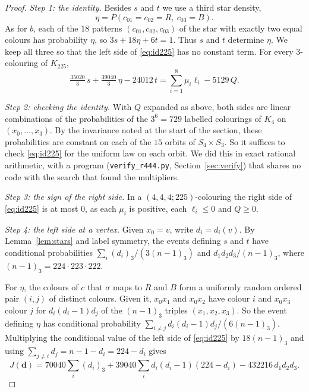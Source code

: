 \documentclass[11pt]{article}
\theoremstyle{spacedplain}
\theoremstyle{spaceddef}
\theoremstyle{spacedremark}
\begin{document}
\begin{proof}
\emph{Step 1: the identity.}
Besides $s$ and $t$ we use a third star density,
\[
\eta=P(c_{01}{=}c_{02}{=}R,\ c_{03}{=}B).
\]
As for $b$, each of the $18$ patterns $(c_{01},c_{02},c_{03})$ of the star with exactly two equal colours has probability $\eta$, so $3s+18\eta+6t=1$.
Thus $s$ and $t$ determine $\eta$.
We keep all three so that the left side of \eqref{eq:id225} has no constant term.
For every $3$-colouring of $K_{225}$,
\begin{equation}\label{eq:id225}
\tfrac{35020}{3}\,s+\tfrac{39040}{3}\,\eta-24012\,t=\sum_{i=1}^8\mu_i\ell_i-5129\,Q .
\end{equation}

\emph{Step 2: checking the identity.}
With $Q$ expanded as above, both sides are linear combinations of the probabilities of the $3^6=729$ labelled colourings of $K_4$ on $(x_0,\dots,x_3)$.
By the invariance noted at the start of the section, these probabilities are constant on each of the $15$ orbits of $S_4\times S_3$.
So it suffices to check \eqref{eq:id225} for the uniform law on each orbit.
We did this in exact rational arithmetic, with a program (\texttt{verify\_r444.py}, Section~\ref{sec:verify}) that shares no code with the search that found the multipliers.

\emph{Step 3: the sign of the right side.}
In a $(4,4,4;225)$-colouring the right side of \eqref{eq:id225} is at most $0$, as each $\mu_i$ is positive, each $\ell_i\le 0$ and $Q\ge 0$.

\emph{Step 4: the left side at a vertex.}
Given $x_0=v$, write $d_i=d_i(v)$.
By Lemma~\ref{lem:stars} and label symmetry, the events defining $s$ and $t$ have conditional probabilities $\sum_i(d_i)_3/(3(n-1)_3)$ and $d_1d_2d_3/(n-1)_3$, where $(n-1)_3=224\cdot223\cdot222$.

For $\eta$, the colours of $c$ that $\sigma$ maps to $R$ and $B$ form a uniformly random ordered pair $(i,j)$ of distinct colours.
Given it, $x_0x_1$ and $x_0x_2$ have colour $i$ and $x_0x_3$ colour $j$ for $d_i(d_i-1)d_j$ of the $(n-1)_3$ triples $(x_1,x_2,x_3)$.
So the event defining $\eta$ has conditional probability $\sum_{i\ne j}d_i(d_i-1)d_j/(6(n-1)_3)$.
Multiplying the conditional value of the left side of \eqref{eq:id225} by $18(n-1)_3$ and using $\sum_{j\ne i}d_j=n-1-d_i=224-d_i$ gives
\[
J(\mathbf d)=70040\sum_i(d_i)_3+39040\sum_id_i(d_i-1)(224-d_i)-432216\,d_1d_2d_3 .
\]


\end{proof}
\end{document}
